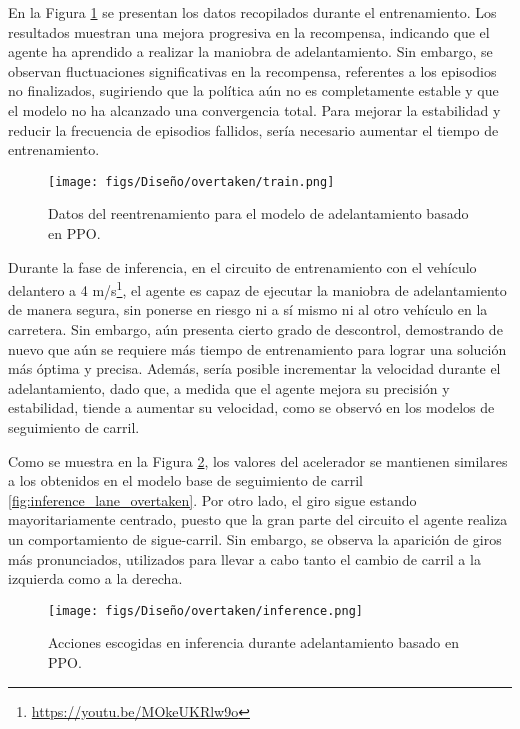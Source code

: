 En la Figura \ref{fig:train_overtaken} se presentan los datos recopilados durante el entrenamiento. Los resultados muestran una mejora progresiva en la recompensa, indicando que el agente ha aprendido a realizar la maniobra de adelantamiento. Sin embargo, se observan fluctuaciones significativas en la recompensa, referentes a los episodios no finalizados, sugiriendo que la política aún no es completamente estable y que el modelo no ha alcanzado una convergencia total. Para mejorar la estabilidad y reducir la frecuencia de episodios fallidos, sería necesario aumentar el tiempo de entrenamiento.
\begin{figure}[ht]
\centering
\texttt{[image: figs/Diseño/overtaken/train.png]}
\caption{Datos del reentrenamiento para el modelo de adelantamiento basado en \ac{PPO}.}
\label{fig:train_overtaken}
\end{figure}

Durante la fase de inferencia, en el circuito de entrenamiento con el vehículo delantero a 4 m/s\footnote{\url{ https://youtu.be/MOkeUKRlw9o}}, el agente es capaz de ejecutar la maniobra de adelantamiento de manera segura, sin ponerse en riesgo ni a sí mismo ni al otro vehículo en la carretera. Sin embargo, aún presenta cierto grado de descontrol, demostrando de nuevo que aún se requiere más tiempo de entrenamiento para lograr una solución más óptima y precisa. Además, sería posible incrementar la velocidad durante el adelantamiento, dado que, a medida que el agente mejora su precisión y estabilidad, tiende a aumentar su velocidad, como se observó en los modelos de seguimiento de carril.

Como se muestra en la Figura \ref{fig:inference_overtaken}, los valores del acelerador se mantienen similares a los obtenidos en el modelo base de seguimiento de carril \ref{fig:inference_lane_overtaken}. Por otro lado, el giro sigue estando mayoritariamente centrado, puesto que la gran parte del circuito el agente realiza un comportamiento de sigue-carril. Sin embargo, se observa la aparición de giros más pronunciados, utilizados para llevar a cabo tanto el cambio de carril a la izquierda como a la derecha.

\begin{figure}[ht]
\centering
\texttt{[image: figs/Diseño/overtaken/inference.png]}
\caption{Acciones escogidas en inferencia durante adelantamiento basado en \ac{PPO}.}
\label{fig:inference_overtaken}
\end{figure}
\newpage

